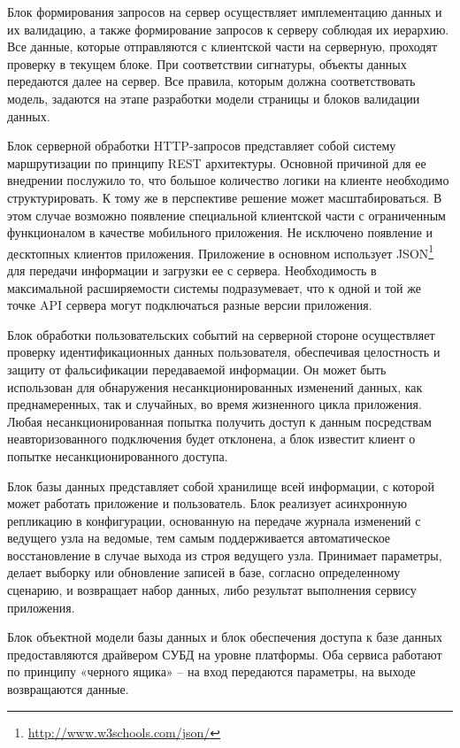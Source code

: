 Блок формирования запросов на сервер осуществляет имплементацию данных и их валидацию, а также формирование запросов к серверу соблюдая их иерархию. Все данные, которые отправляются с клиентской части на серверную, проходят проверку в текущем блоке. При соответствии сигнатуры, объекты данных передаются далее на сервер. Все правила, которым должна соответствовать модель, задаются на этапе разработки модели страницы и блоков валидации данных.

Блок серверной обработки HTTP-запросов представляет собой систему маршрутизации по принципу REST архитектуры. Основной причиной для ее внедрении послужило то, что большое количество логики на клиенте необходимо структурировать. К тому же в перспективе решение может масштабироваться. В этом случае возможно появление специальной клиентской части с ограниченным функционалом в качестве мобильного приложения. Не исключено появление и десктопных клиентов приложения. Приложение в основном использует JSON\footnote{\url{http://www.w3schools.com/json/}} для передачи информации и загрузки ее с сервера. Необходимость в максимальной расширяемости системы подразумевает, что к одной и той же точке API сервера могут подключаться разные версии приложения.

Блок обработки пользовательских событий на серверной стороне осуществляет проверку идентификационных данных пользователя, обеспечивая целостность и защиту от фальсификации передаваемой информации. Он может быть использован для обнаружения несанкционированных изменений данных, как преднамеренных, так и случайных, во время жизненного цикла приложения. Любая несанкционированная попытка получить доступ к данным посредствам неавторизованного подключения будет отклонена, а блок известит клиент о попытке несанкционированного доступа.

Блок базы данных представляет собой хранилище всей информации, с которой может работать приложение и пользователь. Блок реализует асинхронную репликацию в конфигурации, основанную на передаче журнала изменений с ведущего узла на ведомые, тем самым поддерживается автоматическое восстановление в случае выхода из строя ведущего узла. Принимает параметры, делает выборку или обновление записей в базе, согласно определенному сценарию, и возвращает набор данных, либо результат выполнения сервису приложения.

Блок объектной модели базы данных и блок обеспечения доступа к базе данных предоставляются драйвером СУБД на уровне платформы. Оба сервиса работают по принципу «черного ящика» – на вход передаются параметры, на выходе возвращаются данные.